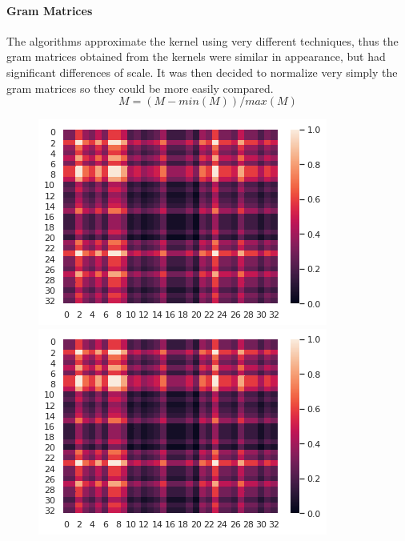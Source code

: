 \documentclass{article}
\theoremstyle{definition}
\begin{document}
\paragraph{Gram Matrices}
The algorithms approximate the kernel using very different techniques, thus the gram matrices obtained from the kernels were similar in appearance, but had significant differences of scale. It was then decided to normalize very simply the gram matrices so they could be more easily compared.
\begin{equation}
M = (M - min(M) )/max(M)
\end{equation}
\begin{figure}[!htb]
	\begin{multicols}{3}
		\includegraphics[width=\linewidth]{data/gram/gram3.png}\par
		\includegraphics[width=\linewidth]{data/gram/gram4.png}\par

\end{multicols}
\end{figure}
\end{document}
